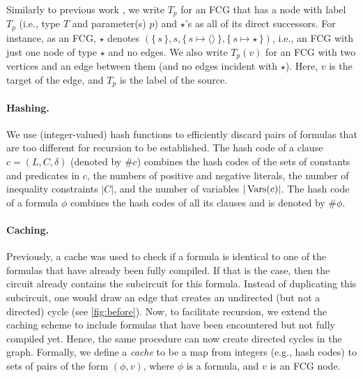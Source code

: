
Similarly to previous work \citep{DBLP:conf/ijcai/BroeckTMDR11}, we write $T_p$
for an FCG that has a node with label $T_p$ (i.e., type $T$ and parameter(s)
$p$) and $\star$'s as all of its direct successors. For instance, as an FCG,
$\star$ denotes
$(\{\, s \,\}, s, \{\, s \mapsto \langle\rangle \,\}, \{\, s \mapsto \star \,\})$,
i.e., an FCG with just one node of type $\star$ and no edges. We also write
$T_p(v)$ for an FCG with two vertices and an edge between them (and no edges
incident with $\star$). Here, $v$ is the target of the edge, and $T_p$ is the
label of the source.

\paragraph{Hashing.}
We use (integer-valued) hash functions to efficiently discard pairs of formulas
that are too different for recursion to be established. The hash code of a
clause $c = (L, C, \delta)$ (denoted by $\# c$) combines the hash codes of the
sets of constants and predicates in $c$, the numbers of positive and negative
literals, the number of inequality constraints $|C|$, and the number of
variables $|\operatorname{Vars}(c)|$. The hash code of a formula $\phi$ combines the hash
codes of all its clauses and is denoted by $\#\phi$.

\paragraph{Caching.}
Previously, a cache was used to check if a formula is identical to one of the
formulas that have already been fully compiled. If that is the case, then the
circuit already contains the subcircuit for this formula. Instead of duplicating
this subcircuit, one would draw an edge that creates an undirected (but not a
directed) cycle (see \cref{fig:before}). Now, to facilitate recursion, we extend
the caching scheme to include formulas that have been encountered but not fully
compiled yet. Hence, the same procedure can now create directed cycles in the
graph. Formally, we define a \emph{cache} to be a map from integers (e.g., hash
codes) to sets of pairs of the form $(\phi, v)$, where $\phi$ is a formula, and
$v$ is an FCG node.



